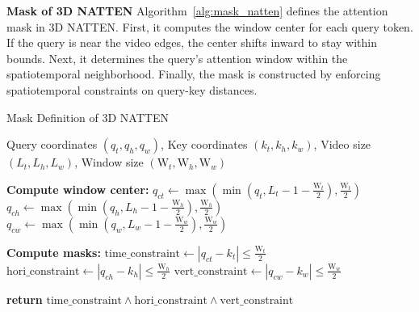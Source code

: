 \textbf{Mask of 3D NATTEN}
Algorithm~\ref{alg:mask_natten} defines the attention mask in 3D NATTEN. First, it computes the window center for each query token. If the query is near the video edges, the center shifts inward to stay within bounds. Next, it determines the query’s attention window within the spatiotemporal neighborhood. Finally, the mask is constructed by enforcing spatiotemporal constraints on query-key distances.
\begin{algorithm}[h]
\caption{Mask Definition of 3D NATTEN}
\label{alg:mask_natten}
\begin{algorithmic}
\REQUIRE Query coordinates $(q_t, q_h, q_w)$, Key coordinates $(k_t, k_h, k_w)$, Video size $(L_t, L_h, L_w)$, Window size $(\text{W}_t, \text{W}_h, \text{W}_w)$

\STATE \textbf{Compute window center:}
\STATE $q_{ct} \gets \max\left(\min\left(q_t, L_t - 1 - \frac{\text{W}_t}{2} \right), \frac{\text{W}_t}{2} \right)$
\STATE $q_{ch} \gets \max\left(\min\left(q_h, L_h - 1 - \frac{\text{W}_h}{2} \right), \frac{\text{W}_h}{2} \right)$
\STATE $q_{cw} \gets \max\left(\min\left(q_w, L_w - 1 - \frac{\text{W}_w}{2} \right), \frac{\text{W}_w}{2} \right)$

\STATE \textbf{Compute masks:}
\STATE $\text{time\_constraint} \gets |q_{ct} - k_t| \leq \frac{\text{W}_t}{2}$
\STATE $\text{hori\_constraint} \gets |q_{ch} - k_h| \leq \frac{\text{W}_h}{2}$
\STATE $\text{vert\_constraint} \gets |q_{cw} - k_w| \leq \frac{\text{W}_w}{2}$

\STATE \textbf{return} $\text{time\_constraint} \land \text{hori\_constraint} \land \text{vert\_constraint}$
\end{algorithmic}
\end{algorithm}

